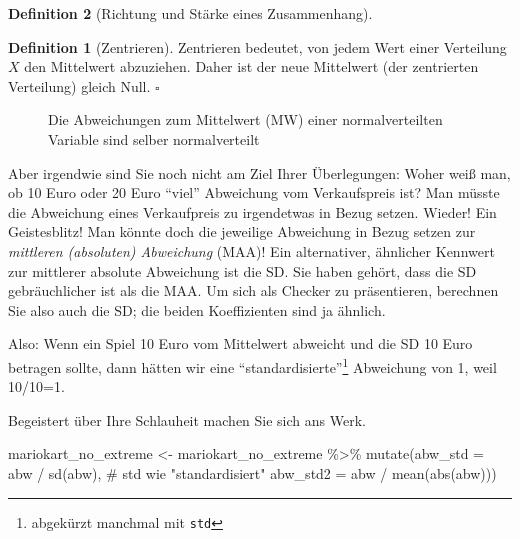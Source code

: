 \documentclass[
  a4paper,
  DIV=11]{scrreprt}
\newenvironment{Shaded}{\begin{snugshade}}{\end{snugshade}}
\newcommand{\AttributeTok}[1]{\textcolor[rgb]{0.40,0.45,0.13}{#1}}
\newcommand{\CommentTok}[1]{\textcolor[rgb]{0.37,0.37,0.37}{#1}}
\newcommand{\FunctionTok}[1]{\textcolor[rgb]{0.28,0.35,0.67}{#1}}
\newcommand{\NormalTok}[1]{\textcolor[rgb]{0.00,0.23,0.31}{#1}}
\newcommand{\OtherTok}[1]{\textcolor[rgb]{0.00,0.23,0.31}{#1}}
\newcommand{\SpecialCharTok}[1]{\textcolor[rgb]{0.37,0.37,0.37}{#1}}
\theoremstyle{definition}
\theoremstyle{definition}
\theoremstyle{definition}
\newtheorem{definition}{Definition}[chapter]
\theoremstyle{remark}
\begin{document}
\begin{definition}[Richtung und Stärke eines
Zusammenhang]
\begin{definition}[Zentrieren]
Zentrieren bedeutet, von jedem Wert einer Verteilung \(X\) den
Mittelwert abzuziehen. Daher ist der neue Mittelwert (der zentrierten
Verteilung) gleich Null. \(\square\)

\end{definition}

\begin{figure}


\caption{\label{fig-norm-dev}Die Abweichungen zum Mittelwert (MW) einer
normalverteilten Variable sind selber normalverteilt}

\end{figure}%

Aber irgendwie sind Sie noch nicht am Ziel Ihrer Überlegungen: Woher
weiß man, ob 10 Euro oder 20 Euro ``viel'' Abweichung vom Verkaufspreis
ist? Man müsste die Abweichung eines Verkaufpreis zu irgendetwas in
Bezug setzen. Wieder! Ein Geistesblitz! Man könnte doch die jeweilige
Abweichung in Bezug setzen zur \emph{mittleren (absoluten) Abweichung}
(MAA)! Ein alternativer, ähnlicher Kennwert zur mittlerer absolute
Abweichung ist die SD. Sie haben gehört, dass die SD gebräuchlicher ist
als die MAA. Um sich als Checker zu präsentieren, berechnen Sie also
auch die SD; die beiden Koeffizienten sind ja ähnlich.

Also: Wenn ein Spiel 10 Euro vom Mittelwert abweicht und die SD 10 Euro
betragen sollte, dann hätten wir eine ``standardisierte''\footnote{abgekürzt
  manchmal mit \texttt{std}} Abweichung von 1, weil 10/10=1.

Begeistert über Ihre Schlauheit machen Sie sich ans Werk.

\begin{Shaded}
\begin{Highlighting}[]
\NormalTok{mariokart\_no\_extreme }\OtherTok{\textless{}{-}}
\NormalTok{  mariokart\_no\_extreme }\SpecialCharTok{\%\textgreater{}\%} 
  \FunctionTok{mutate}\NormalTok{(}\AttributeTok{abw\_std =}\NormalTok{ abw }\SpecialCharTok{/} \FunctionTok{sd}\NormalTok{(abw),  }\CommentTok{\# std wie "standardisiert"}
         \AttributeTok{abw\_std2 =}\NormalTok{ abw }\SpecialCharTok{/} \FunctionTok{mean}\NormalTok{(}\FunctionTok{abs}\NormalTok{(abw)))  }
\end{Highlighting}
\end{Shaded}


\end{definition}
\end{document}

